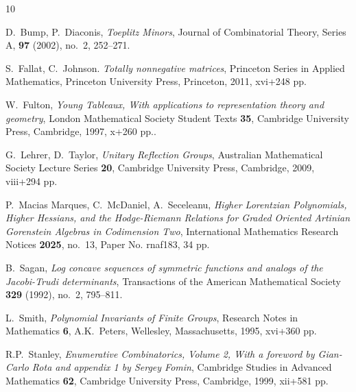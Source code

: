 \documentclass[unnumsec,webpdf,modern,medium]{oup-authoring-template}
\theoremstyle{theorem}
\theoremstyle{definition}
\begin{document}
\bigskip



%
%
%

\begin{thebibliography}{10}

D.~Bump, P.~Diaconis,
\emph{Toeplitz Minors},
Journal of Combinatorial Theory, Series A,
\textbf{97} (2002), no.\ 2,
252--271.

S.~Fallat, C.~Johnson.
\emph{Totally nonnegative matrices},
Princeton Series in Applied Mathematics,
Princeton University Press, Princeton, 2011, xvi+248 pp.


W.~Fulton,
\emph{Young Tableaux, With applications to representation theory and geometry},
London Mathematical Society Student Texts \textbf{35}, Cambridge University Press, Cambridge, 1997, x+260 pp..

G.~Lehrer, D.~Taylor, 
\emph{Unitary Reflection Groups}, 
Australian Mathematical Society Lecture Series \textbf{20}, Cambridge University Press, Cambridge, 2009, viii+294 pp.

P.~Macias Marques, C.~McDaniel, A.~Seceleanu, 
\emph{Higher Lorentzian Polynomials, Higher Hessians, and the Hodge-Riemann Relations for Graded Oriented Artinian Gorenstein Algebras in Codimension Two}, 
International Mathematics Research Notices \textbf{2025}, no.\ 13, Paper No. rnaf183, 34 pp. %

B.~Sagan, 
\emph{Log concave sequences of symmetric functions and analogs of the Jacobi-Trudi determinants},
Transactions of the American Mathematical Society \textbf{329} (1992), no.\ 2, 795--811.

L.~Smith, 
\emph{Polynomial Invariants of Finite Groups},  
Research Notes in Mathematics \textbf{6}, A.K.~Peters, Wellesley, Massachusetts, 1995, xvi+360 pp.


R.P.~Stanley,
\emph{Enumerative Combinatorics, Volume 2, With a foreword by Gian-Carlo Rota and appendix 1 by Sergey Fomin},
Cambridge Studies in Advanced Mathematics \textbf{62}, Cambridge University Press, Cambridge, 1999, xii+581 pp.


\end{thebibliography}
\end{document}
